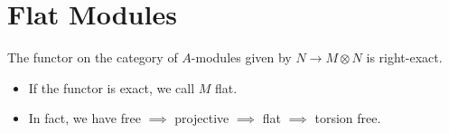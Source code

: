 \section{Flat Modules}
The functor on the category of $A$-modules given by $N \rightarrow M \otimes N$ is right-exact.
\begin{itemize}
    \item If the functor is exact, we call $M$ flat.
    \item In fact, we have free $\implies$ projective $\implies$ flat $\implies$ torsion free.
\end{itemize}
